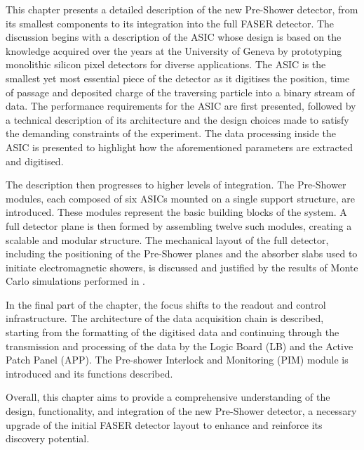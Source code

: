 This chapter presents a detailed description of the new Pre-Shower detector, from its smallest components to its integration into the full FASER detector. The discussion begins with a description of the ASIC whose design is based on the knowledge acquired over the years at the University of Geneva by prototyping monolithic silicon pixel detectors for diverse applications. The ASIC is the smallest yet most essential piece of the detector as it digitises the position, time of passage and deposited charge of the traversing particle into a binary stream of data. The performance requirements for the ASIC are first presented, followed by a technical description of its architecture and the design choices made to satisfy the demanding constraints of the experiment. The data processing inside the ASIC is presented to highlight how the aforementioned parameters are extracted and digitised.  

The description then progresses to higher levels of integration. The Pre-Shower modules, each composed of six ASICs mounted on a single support structure, are introduced. These modules represent the basic building blocks of the system. A full detector plane is then formed by assembling twelve such modules, creating a scalable and modular structure. The mechanical layout of the full detector, including the positioning of the Pre-Shower planes and the absorber slabs used to initiate electromagnetic showers, is discussed and justified by the results of Monte Carlo simulations performed in  .

In the final part of the chapter, the focus shifts to the readout and control infrastructure. The architecture of the data acquisition chain is described, starting from the formatting of the digitised data and continuing through the transmission and processing of the data by the Logic Board (LB) and the Active Patch Panel (APP). The Pre-shower Interlock and Monitoring (PIM) module is introduced and its functions described.

Overall, this chapter aims to provide a comprehensive understanding of the design, functionality, and integration of the new Pre-Shower detector, a necessary upgrade of the initial FASER detector layout to enhance and reinforce its discovery potential.
	\clearpage 
